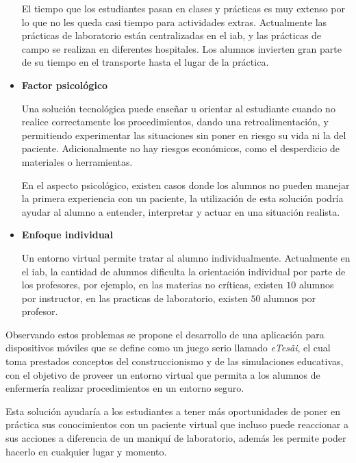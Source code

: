 \begin{itemize}
    El tiempo que los estudiantes pasan en clases y prácticas es muy extenso por
    lo que no les queda casi tiempo para actividades extras. Actualmente las
    prácticas de laboratorio están centralizadas en el \Gls{iab}, y las
    prácticas de campo se realizan en diferentes hospitales. Los alumnos
    invierten gran parte de su tiempo en el transporte hasta el lugar de la
    práctica.
    
\item \textbf{Factor psicológico}

    Una solución tecnológica puede enseñar u orientar al estudiante cuando no
    realice correctamente los procedimientos, dando una retroalimentación, y
    permitiendo experimentar las situaciones sin poner en riesgo su vida ni la
    del paciente. Adicionalmente no hay riesgos económicos, como el desperdicio
    de materiales o herramientas.

    En el aspecto psicológico, existen casos donde los alumnos no pueden manejar
    la primera experiencia con un paciente, la utilización de esta solución
    podría ayudar al alumno a entender, interpretar y actuar en una situación
    realista.   

\item \textbf{Enfoque individual}

    Un entorno virtual permite tratar al alumno individualmente. Actualmente en
    el \gls{iab}, la cantidad de alumnos dificulta la orientación individual por
    parte de los profesores, por ejemplo, en las materias no críticas, existen
    $10$ alumnos por instructor, en las practicas de laboratorio, existen $50$
    alumnos por profesor.

    

\end{itemize}


Observando estos problemas se propone el desarrollo de una aplicación para
dispositivos móviles que se define como un juego serio llamado
\textit{eTes\~{a}i}, el cual toma prestados conceptos del construccionismo y
de las simulaciones educativas, con el objetivo de proveer un entorno virtual
que permita a los alumnos de enfermería realizar procedimientos en un entorno
seguro.

Esta solución ayudaría a los estudiantes a tener más oportunidades de poner en
práctica sus conocimientos con un paciente virtual que incluso puede reaccionar
a sus acciones a diferencia de un maniquí de laboratorio, además les permite
poder hacerlo en cualquier lugar y momento.

